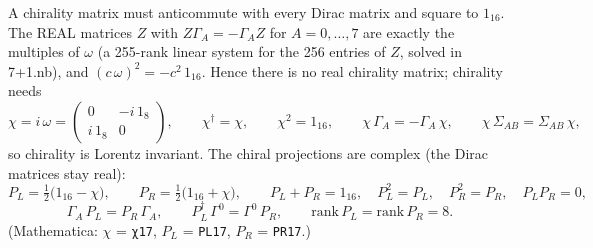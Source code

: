 \documentclass[10pt,a4paper]{article}
\begin{document}
A chirality matrix must anticommute with every Dirac matrix and square to $1_{16}$. The REAL matrices $Z$ with $Z\Gamma_A=-\Gamma_AZ$ for $A=0,\dots,7$ are exactly the multiples of $\omega$ (a 255-rank linear system for the 256 entries of $Z$, solved in 7+1.nb), and $(c\,\omega)^2=-c^2\,1_{16}$. Hence there is no real chirality matrix; chirality needs
\begin{equation*}
\chi=i\,\omega=\begin{pmatrix}0&-i\,1_8\\ i\,1_8&0\end{pmatrix},\qquad \chi^\dagger=\chi,\qquad \chi^2=1_{16},\qquad \chi\,\Gamma_A=-\Gamma_A\,\chi,\qquad \chi\,\Sigma_{AB}=\Sigma_{AB}\,\chi,
\end{equation*}
so chirality is Lorentz invariant. The chiral projections are complex (the Dirac matrices stay real):
\begin{equation*}
P_L=\tfrac12\big(1_{16}-\chi\big),\qquad P_R=\tfrac12\big(1_{16}+\chi\big),\qquad P_L+P_R=1_{16},\quad P_L^2=P_L,\quad P_R^2=P_R,\quad P_LP_R=0,
\end{equation*}
\begin{equation*}
\Gamma_A\,P_L=P_R\,\Gamma_A,\qquad P_L^\dagger\,\Gamma^0=\Gamma^0\,P_R,\qquad \mathrm{rank}\,P_L=\mathrm{rank}\,P_R=8 .
\end{equation*}
(Mathematica: $\chi$ = \texttt{χ17}, $P_L$ = \texttt{PL17}, $P_R$ = \texttt{PR17}.)
\end{document}
